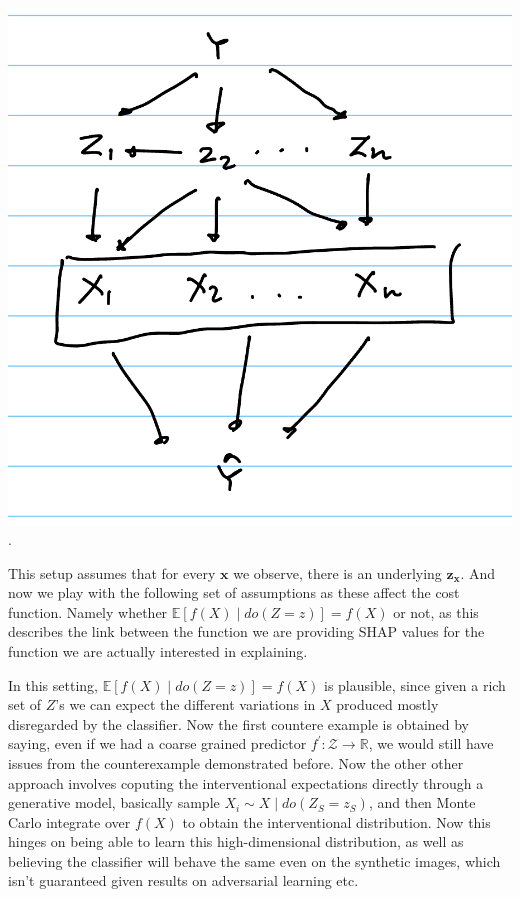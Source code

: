\documentclass{article}
\begin{document}
\begin{center}
\includegraphics[scale = 0.2]{Z_before_X.jpeg}. 
\end{center}

This setup assumes that for every $\mathbf{x}$  we observe, there is an underlying $\mathbf{z}_\mathbf{x}$. And now we play with the following set of assumptions as these affect the cost function. Namely whether $
\mathbb{E}[f(X) \mid do(Z = z)] = f(X)$ or not, as this describes the link between the function we are providing SHAP values for the function we are actually interested in explaining. 

In this setting, $\mathbb{E}[f(X) \mid do(Z = z)] = f(X)$ is plausible, since given a rich set of $Z$'s we can expect the different variations in $X$ produced mostly disregarded by the classifier. Now the first countere example is obtained by saying, even if we had a coarse grained predictor $f^\prime : \mathcal{Z} \rightarrow \mathbb{R}$, we would still have issues from the counterexample demonstrated before. Now the other other approach involves coputing the interventional expectations directly through a generative model, basically sample $X_i \sim X \mid do(Z_S = z_S)$, and then Monte Carlo integrate over $f(X)$ to obtain the interventional distribution. Now this hinges on being able to learn this high-dimensional distribution, as well as believing the classifier will behave the same even on the synthetic images, which isn't guaranteed given results on adversarial learning etc.
\end{document}
